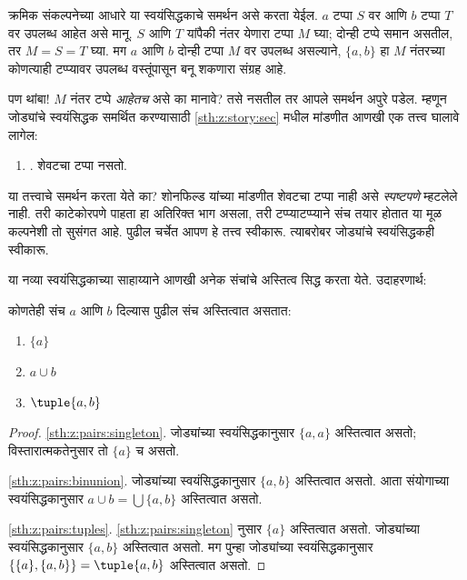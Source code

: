 क्रमिक संकल्पनेच्या आधारे या स्वयंसिद्धकाचे समर्थन असे करता येईल. $a$ टप्पा $S$ वर आणि $b$ टप्पा $T$ वर उपलब्ध आहेत असे मानू. $S$ आणि $T$ यांपैकी नंतर येणारा टप्पा $M$ घ्या; दोन्ही टप्पे समान असतील, तर $M=S=T$ घ्या. मग $a$ आणि $b$ दोन्ही टप्पा $M$ वर उपलब्ध असल्याने, $\{a,b\}$ हा $M$ नंतरच्या कोणत्याही टप्प्यावर उपलब्ध वस्तूंपासून बनू शकणारा संग्रह आहे.

पण थांबा!{} $M$ नंतर टप्पे \emph{आहेतच} असे का मानावे? तसे नसतील तर आपले समर्थन अपुरे पडेल. म्हणून जोड्यांचे स्वयंसिद्धक समर्थित करण्यासाठी \ref{sth:z:story:sec} मधील मांडणीत आणखी एक तत्त्व घालावे लागेल:
\begin{enumerate}
\item[] \stagessucc. शेवटचा टप्पा नसतो.
\end{enumerate}
या तत्त्वाचे समर्थन करता येते का? शोनफिल्ड यांच्या मांडणीत शेवटचा टप्पा नाही असे \emph{स्पष्टपणे} म्हटलेले नाही. तरी काटेकोरपणे पाहता हा अतिरिक्त भाग असला, तरी टप्प्याटप्प्याने संच तयार होतात या मूळ कल्पनेशी तो सुसंगत आहे. पुढील चर्चेत आपण हे तत्त्व स्वीकारू. त्याबरोबर जोड्यांचे स्वयंसिद्धकही स्वीकारू.

या नव्या स्वयंसिद्धकाच्या साहाय्याने आणखी अनेक संचांचे अस्तित्व सिद्ध करता येते. उदाहरणार्थ:

\begin{prop}\label{sth:z:pairs:prop:pairsconsequences}
कोणतेही संच $a$ आणि $b$ दिल्यास पुढील संच अस्तित्वात असतात:
\begin{enumerate}
\item\label{sth:z:pairs:singleton} $\{a\}$
\item\label{sth:z:pairs:binunion} $a \cup b$
\item\label{sth:z:pairs:tuples} $\tuple{a, b}$
\end{enumerate}
\end{prop}

\begin{proof}
\ref{sth:z:pairs:singleton}. जोड्यांच्या स्वयंसिद्धकानुसार $\{a, a\}$ अस्तित्वात असतो; विस्तारात्मकतेनुसार तो $\{a\}$ च असतो.

\ref{sth:z:pairs:binunion}. जोड्यांच्या स्वयंसिद्धकानुसार $\{a, b\}$ अस्तित्वात असतो. आता संयोगाच्या स्वयंसिद्धकानुसार $a \cup b = \bigcup
\{a, b\}$ अस्तित्वात असतो.

\ref{sth:z:pairs:tuples}. \ref{sth:z:pairs:singleton} नुसार $\{a\}$ अस्तित्वात असतो. जोड्यांच्या स्वयंसिद्धकानुसार $\{a,
b\}$ अस्तित्वात असतो. मग पुन्हा जोड्यांच्या स्वयंसिद्धकानुसार $\{\{a\}, \{a, b\}\} = \tuple{a, b}$ अस्तित्वात असतो.
\end{proof}

